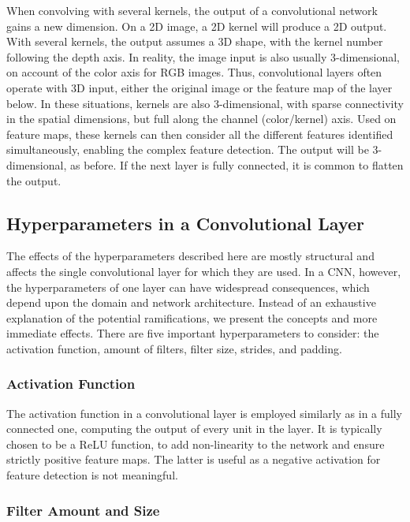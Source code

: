 \noindent When convolving with several kernels, the output of a convolutional network gains a new dimension. On a 2D image, a 2D kernel will produce a 2D output. With several kernels, the output assumes a 3D shape, with the kernel number following the depth axis. In reality, the image input is also usually 3-dimensional, on account of the color axis for RGB images. Thus, convolutional layers often operate with 3D input, either the original image or the feature map of the layer below. In these situations, kernels are also 3-dimensional, with sparse connectivity in the spatial dimensions, but full along the channel (color/kernel) axis. Used on feature maps, these kernels can then consider all the different features identified simultaneously, enabling the complex feature detection. The output will be 3-dimensional, as before. If the next layer is fully connected, it is common to flatten the output.

\subsection{Hyperparameters in a Convolutional Layer}

The effects of the hyperparameters described here are mostly structural and affects the single convolutional layer for which they are used. In a CNN, however, the hyperparameters of one layer can have widespread consequences, which depend upon the domain and network architecture. Instead of an exhaustive explanation of the potential ramifications, we present the concepts and more immediate effects. There are five important hyperparameters to consider: the activation function, amount of filters, filter size, strides, and padding. 

\subsubsection{Activation Function}

The activation function in a convolutional layer is employed similarly as in a fully connected one, computing the output of every unit in the layer. It is typically chosen to be a ReLU function, to add non-linearity to the network and ensure strictly positive feature maps. The latter is useful as a negative activation for feature detection is not meaningful.

\subsubsection{Filter Amount and Size}

